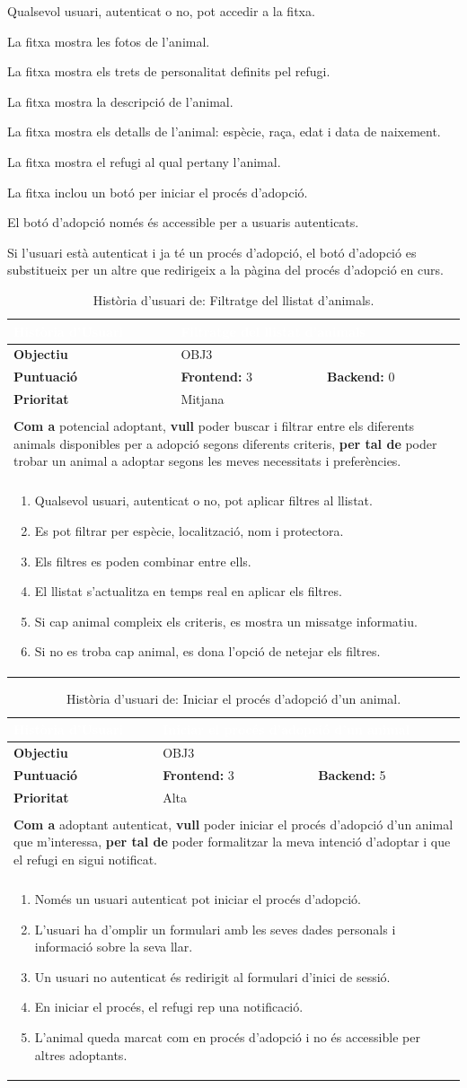 \documentclass[11pt,a4paper]{report}
\newcommand{\HU}[9]{%
\begin{table}[H]\centering\footnotesize\renewcommand{\arraystretch}{1.1}%
\setlength{\extrarowheight}{0pt}%
\begin{tabular}{|l|p{4.8cm}|p{4.8cm}|}\hline
\rowcolor{oceanblue}\textcolor{white}{\textbf{Història d'Usuari}} & \multicolumn{2}{l|}{\textcolor{white}{#2}} \\\hline
\textbf{Objectiu} & \multicolumn{2}{l|}{#1} \\\hline
\rowcolor{gray!10}\textbf{Puntuació} & \textbf{Frontend: } #3 & \textbf{Backend: } #4 \\\hline
\textbf{Prioritat} & \multicolumn{2}{l|}{#5} \\\hline
\rowcolor{oceanblue}\multicolumn{3}{|l|}{\textcolor{white}{\textbf{Descripció}}} \\\hline
\multicolumn{3}{|p{12.5cm}|}{\textbf{Com a} #6, \textbf{vull} #7, \textbf{per tal de} #8.} \\\hline
\rowcolor{oceanblue}\multicolumn{3}{|l|}{\textcolor{white}{\textbf{Criteris d'Acceptació}}} \\\hline
\multicolumn{3}{|p{12.5cm}|}{\begin{enumerate}[leftmargin=0.4cm,topsep=0pt,parsep=0pt,itemsep=1pt,partopsep=0pt,after=\vspace{-3pt}] #9 \end{enumerate}} \\\hline
\end{tabular}\caption[HU: #2]{Història d'usuari de: #2.}\label{tab:hu_#1}\end{table}%
}
\begin{document}
    {
        \item Qualsevol usuari, autenticat o no, pot accedir a la fitxa.
        \item La fitxa mostra les fotos de l'animal.
        \item La fitxa mostra els trets de personalitat definits pel refugi.
        \item La fitxa mostra la descripció de l'animal.
        \item La fitxa mostra els detalls de l'animal: espècie, raça, edat i data de naixement.
        \item La fitxa mostra el refugi al qual pertany l'animal.
        \item La fitxa inclou un botó per iniciar el procés d'adopció.
        \item El botó d'adopció només és accessible per a usuaris autenticats.
        \item Si l'usuari està autenticat i ja té un procés d'adopció, el botó d'adopció es substitueix per un altre que redirigeix a la pàgina del procés d'adopció en curs.
    }
    \HU{OBJ3}
    {Filtratge del llistat d'animals}
    {3}
    {0}
    {Mitjana}
    {potencial adoptant}
    {poder buscar i filtrar entre els diferents animals disponibles per a adopció segons diferents criteris}
    {poder trobar un animal a adoptar segons les meves necessitats i preferències}
    {
        \item Qualsevol usuari, autenticat o no, pot aplicar filtres al llistat.
        \item Es pot filtrar per espècie, localització, nom i protectora.
        \item Els filtres es poden combinar entre ells.
        \item El llistat s'actualitza en temps real en aplicar els filtres.
        \item Si cap animal compleix els criteris, es mostra un missatge informatiu.
        \item Si no es troba cap animal, es dona l'opció de netejar els filtres.
    }
    \HU{OBJ3}
    {Iniciar el procés d'adopció d'un animal}
    {3}
    {5}
    {Alta}
    {adoptant autenticat}
    {poder iniciar el procés d'adopció d'un animal que m'interessa}
    {poder formalitzar la meva intenció d'adoptar i que el refugi en sigui notificat}
    {
        \item Només un usuari autenticat pot iniciar el procés d'adopció.
        \item L'usuari ha d'omplir un formulari amb les seves dades personals i informació sobre la seva llar.
        \item Un usuari no autenticat és redirigit al formulari d'inici de sessió.
        \item En iniciar el procés, el refugi rep una notificació.
        \item L'animal queda marcat com en procés d'adopció i no és accessible per altres adoptants.
    }
\end{document}
